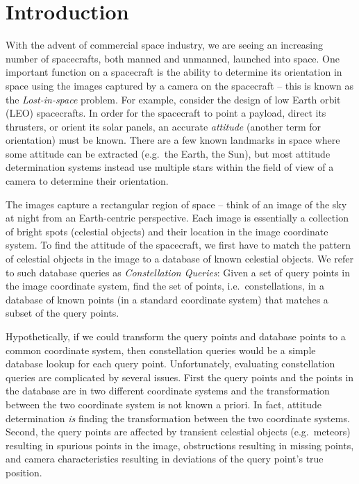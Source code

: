 \newcommand{\imageset}{\texttt{IMG}}
\newcommand{\databaseset}{\texttt{DB}}
\newcommand{\imagesubset}{b}
\newcommand{\databasesubset}{R}
\newcommand{\candidateset}{r}
\newcommand{\solutionmap}{h}

\newcommand{\genericdatabase}{\texttt{X\_DB}}
\newcommand{\angdatabase}{\texttt{ANG\_DB}}
\newcommand{\dotdatabase}{\texttt{DOT\_DB}}
\newcommand{\intdatabase}{\texttt{INT\_DB}}
\newcommand{\sphdatabase}{\texttt{SPH\_DB}}
\newcommand{\plndatabase}{\texttt{PLN\_DB}}
\newcommand{\pyrdatabase}{\texttt{PYR\_DB}}
\newcommand{\comdatabase}{\texttt{COM\_DB}}

\section{Introduction}\label{sec:introduction}
With the advent of commercial space industry, we are seeing an increasing number of spacecrafts, both manned and unmanned, launched into space.
One important function on a spacecraft is the ability to determine its orientation in space using the images captured by a camera on the spacecraft -- this is known as the \textit{Lost-in-space} problem.
For example, consider the design of low Earth orbit (LEO) spacecrafts.
In order for the spacecraft to point a payload, direct its thrusters, or orient its solar panels, an accurate \textit{attitude} (another term for orientation) must be known.
There are a few known landmarks in space where some attitude can be extracted (e.g.\ the Earth, the Sun), but most attitude determination systems instead use multiple stars within the field of view of a camera to determine their orientation.

The images capture a rectangular region of space -- think of an image of the sky at night from an Earth-centric perspective.
Each image is essentially a collection of bright spots (celestial objects) and their location in the image coordinate system.
To find the attitude of the spacecraft, we first have to match the pattern of celestial objects in the image to a database of known celestial objects.
We refer to such database queries as \textit{Constellation Queries}:
Given a set of query points in the image coordinate system, find the set of points, i.e.\ constellations, in a database of known points (in a standard coordinate system) that matches a subset of the query points.

Hypothetically, if we could transform the query points and database points to a common coordinate system, then constellation queries would be a simple database lookup for each query point.
Unfortunately, evaluating constellation queries are complicated by several issues.
First the query points and the points in the database are in two different coordinate systems and the transformation between the two coordinate system is not known a priori.
In fact, attitude determination \emph{is} finding the transformation between the two coordinate systems.
Second, the query points are affected by transient celestial objects (e.g.\ meteors) resulting in spurious points in the image, obstructions resulting in missing points, and camera characteristics resulting in deviations of the query point's true position.


